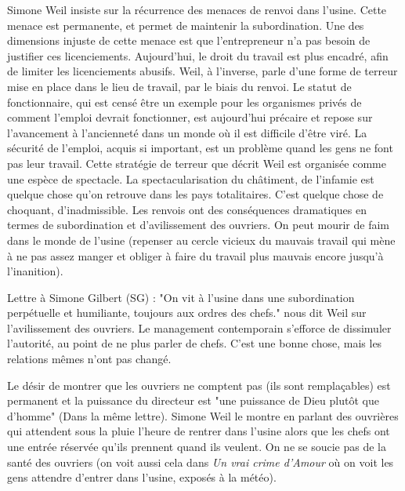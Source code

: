 \documentclass[a4paper,12pt]{book}
\begin{document}
\par Simone Weil insiste sur la récurrence des menaces de renvoi dans l'usine. Cette menace est permanente, et permet de maintenir la subordination. Une des dimensions injuste de cette menace est que l'entrepreneur n'a pas besoin de justifier ces licenciements. Aujourd'hui, le droit du travail est plus encadré, afin de limiter les licenciements abusifs. Weil, à l'inverse, parle d'une forme de terreur mise en place dans le lieu de travail, par le biais du renvoi. Le statut de fonctionnaire, qui est censé être un exemple pour les organismes privés de comment l'emploi devrait fonctionner, est aujourd'hui précaire et repose sur l'avancement à l'ancienneté dans un monde où il est difficile d'être viré. La sécurité de l'emploi, acquis si important, est un problème quand les gens ne font pas leur travail. Cette stratégie de terreur que décrit Weil est organisée comme une espèce de spectacle. La spectacularisation du châtiment, de l'infamie est quelque chose qu'on retrouve dans les pays totalitaires. C'est quelque chose de choquant, d'inadmissible. Les renvois ont des conséquences dramatiques en termes de subordination et d'avilissement des ouvriers. On peut mourir de faim dans le monde de l'usine (repenser au cercle vicieux du mauvais travail qui mène à ne pas assez manger et obliger à faire du travail plus mauvais encore jusqu'à l'inanition).
\par Lettre à Simone Gilbert (SG) : "On vit à l'usine dans une subordination perpétuelle et humiliante, toujours aux ordres des chefs." nous dit Weil sur l'avilissement des ouvriers. Le management contemporain s'efforce de dissimuler l'autorité, au point de ne plus parler de chefs. C'est une bonne chose, mais les relations mêmes n'ont pas changé.
\par Le désir de montrer que les ouvriers ne comptent pas (ils sont remplaçables) est permanent et la puissance du directeur est "une puissance de Dieu plutôt que d'homme" (Dans la même lettre). Simone Weil le montre en parlant des ouvrières qui attendent sous la pluie l'heure de rentrer dans l'usine alors que les chefs ont une entrée réservée qu'ils prennent quand ils veulent. On ne se soucie pas de la santé des ouvriers (on voit aussi cela dans \textit{Un vrai crime d'Amour} où on voit les gens attendre d'entrer dans l'usine, exposés à la météo).
\end{document}
